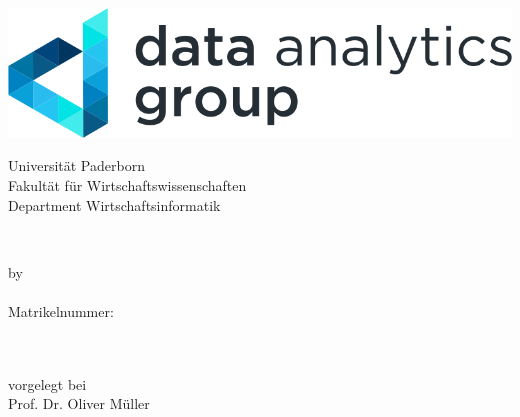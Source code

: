 \vfil

\begin{titlepage}

        \begin{center}
        	\includegraphics[scale=1.]{img/data_analytics_group.png}
        \end{center}
        
        \vspace{8ex}
        
        \begin{center}
            
            Universität Paderborn\\
            Fakultät für Wirtschaftswissenschaften\\
            Department Wirtschaftsinformatik\\
            
            \vspace{8ex}
            
            \Large
            \abschlussarbeit\\
            
            \vspace{7ex}
            
            \textbf{\sffamily{\titel}}
            
            \vspace{7ex}
            
            \normalsize
            
            by\\
            \name\\
            Matrikelnummer:~\matrikelnummer\\
            \adresse\\
            \upbmail\\
            
            \vspace{8ex}
            
            vorgelegt bei\\
            Prof. Dr. Oliver Müller\\
            \zweitpruefer\\
            
            \vspace{10ex}
            
            \abgabedatum
            
        \end{center}
        
    \end{titlepage}
    
\vfil